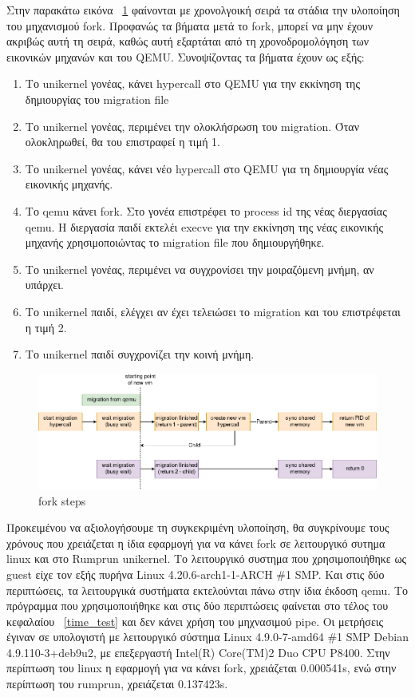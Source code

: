 Στην παρακάτω εικόνα ~\ref{fig4_11} φαίνονται με χρονολγοική σειρά τα στάδια
την υλοποίηση του μηχανισμού fork. Προφανώς τα βήματα μετά το fork, μπορεί να
μην έχουν ακριβώς αυτή τη σειρά, καθώς αυτή εξαρτάται από τη χρονοδρομολόγηση
των εικονικών μηχανών και του QEMU. Συνοψίζοντας τα βήματα έχουν ως εξής:
\begin{enumerate}
	\item Το unikernel γονέας, κάνει hypercall στο QEMU για την εκκίνηση της
		δημιουργίας του migration file 
	\item Το unikernel γονέας, περιμένει την ολοκλήσρωση του migration. Όταν
		ολοκληρωθεί, θα του επιστραφεί η τιμή 1.
	\item Το unikernel γονέας, κάνει νέο hypercall στο QEMU για τη
		δημιουργία νέας εικονικής μηχανής. 
	\item Το qemu κάνει fork. Στο γονέα επιστρέφει το process id της νέας
		διεργασίας qemu. Η διεργασία παιδί εκτελέι execve για την
		εκκίνηση της νέας εικονικής μηχανής χρησιμοποιώντας το migration
		file που δημιουργήθηκε. 
	\item Το unikernel γονέας, περιμένει να συγχρονίσει την μοιραζόμενη
		μνήμη, αν υπάρχει.
	\item Το unikernel παιδί, ελέγχει αν έχει τελειώσει το migration και του
		επιστρέφεται η τιμή 2.
	\item Το unikernel παιδί συγχρονίζει την κοινή μνήμη.
\end{enumerate}

\begin{figure}[htp]
\centerline{\includegraphics[scale=0.5]{figures/fork_timeline_colord.png}}
\caption{fork steps\label{fig4_11}}
\end{figure}

Προκειμένου να αξιολογήσουμε τη συγκεκριμένη υλοποίηση, θα συγκρίνουμε τους
χρόνους που χρειάζεται η ίδια εφαρμογή για να κάνει fork σε λειτουργικό συτημα
linux και στο Rumprun unikernel. Το λειτουργικό συστημα που χρησιμοποιήθηκε ως
guest είχε τον εξής πυρήνα Linux 4.20.6-arch1-1-ARCH \#1 SMP. Και στις δύο
περιπτώσεις, τα λειτουργικά συστήματα εκτελούνται πάνω στην ίδια έκδοση qemu. Το
πρόγραμμα που χρησιμοποιήθηκε και στις δύο περιπτώσεις φαίνεται στο τέλος του
κεφαλαίου ~\ref{time_test} και δεν κάνει χρήση του μηχνασιμού pipe. Οι μετρήσεις
έγιναν σε υπολογιστή με λειτουργικό σύστημα Linux 4.9.0-7-amd64 \#1 SMP Debian
4.9.110-3+deb9u2, με επεξεργαστή Intel(R) Core(TM)2 Duo CPU P8400. Στην
περίπτωση του linux η εφαρμογή για να κάνει fork, χρειάζεται 0.000541s,  ενώ
στην περίπτωση του rumprun, χρειάζεται 0.137423s. 

